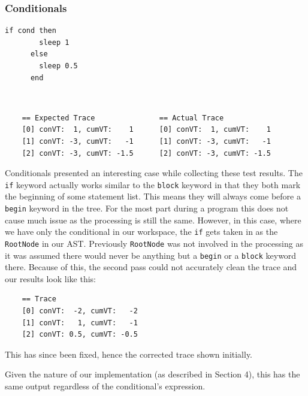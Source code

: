 \documentclass[11pt, abstracton, twoside, titlepage=true]{scrartcl}
\begin{document}
\subsubsection{Conditionals} \label{evalCond}
\begin{minipage}{\textwidth}
	\begin{lstlisting}[style = sonicpi]
      if cond then
        sleep 1
      else
        sleep 0.5
      end
	\end{lstlisting}
\end{minipage}
\\
\begin{lstlisting}
    == Expected Trace               == Actual Trace
    [0] conVT:  1, cumVT:    1      [0] conVT:  1, cumVT:    1
    [1] conVT: -3, cumVT:   -1      [1] conVT: -3, cumVT:   -1
    [2] conVT: -3, cumVT: -1.5      [2] conVT: -3, cumVT: -1.5
\end{lstlisting}

Conditionals presented an interesting case while collecting these test results. The
\texttt{if} keyword actually works similar to the \texttt{block} keyword in that 
they both mark the beginning of some statement list. This means they will always 
come before a \texttt{begin} keyword in the tree. For the most part during a program 
this does not cause much issue as the processing is still the same. However, in 
this case, where we have only the conditional in our workspace, the \texttt{if} gets 
taken in as the \texttt{RootNode} in our AST. Previously \texttt{RootNode} was 
not involved in the processing as it was assumed there would never be anything but 
a \texttt{begin} or a \texttt{block} keyword there. Because of this, the second 
pass could not accurately clean the trace and our results look like this:
\\
\begin{lstlisting}
    == Trace
    [0] conVT:  -2, cumVT:   -2
    [1] conVT:   1, cumVT:   -1
    [2] conVT: 0.5, cumVT: -0.5
\end{lstlisting}

This has since been fixed, hence the corrected trace shown initially.

Given the nature of our implementation (as described in Section 4), this has the
same output regardless of the conditional's expression.
\end{document}
